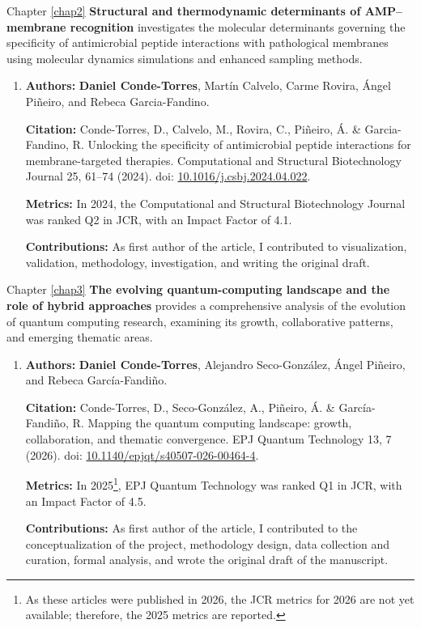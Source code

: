 Chapter \ref{chap2} \textbf{Structural and thermodynamic determinants of AMP–membrane recognition} investigates the molecular determinants governing the specificity of antimicrobial peptide interactions with pathological membranes using molecular dynamics simulations and enhanced sampling methods.
\begin{enumerate}
    \item \textbf{Authors:} \textbf{Daniel Conde-Torres}, Martín Calvelo, Carme Rovira, Ángel Piñeiro, and Rebeca Garcia-Fandino.
    
    \textbf{Citation:} Conde-Torres, D., Calvelo, M., Rovira, C., Piñeiro, Á. \& Garcia-Fandino, R. Unlocking the specificity of antimicrobial peptide interactions for membrane-targeted therapies. Computational and Structural Biotechnology Journal 25, 61–74 (2024). doi: \href{https://doi.org/10.1016/j.csbj.2024.04.022}{10.1016/j.csbj.2024.04.022}.

    \textbf{Metrics:} In 2024, the Computational and Structural Biotechnology Journal was ranked Q2 in JCR, with an Impact Factor of 4.1.

    \textbf{Contributions:} As first author of the article, I contributed to visualization, validation, methodology, investigation, and writing the original draft.
\end{enumerate}






Chapter \ref{chap3}  \textbf{The evolving quantum-computing landscape and the role of hybrid approaches} provides a comprehensive analysis of the evolution of quantum computing research, examining its growth, collaborative patterns, and emerging thematic areas.
\begin{enumerate}
    \item \textbf{Authors:} \textbf{Daniel Conde-Torres}, Alejandro Seco-González, Ángel Piñeiro, and Rebeca García-Fandiño.
    
    \textbf{Citation:} Conde-Torres, D., Seco-González, A., Piñeiro, Á. \& García-Fandiño, R. Mapping the quantum computing landscape: growth, collaboration, and thematic convergence. EPJ Quantum Technology 13, 7 (2026). doi: \href{https://doi.org/10.1140/epjqt/s40507-026-00464-4}{10.1140/epjqt/s40507-026-00464-4}.
    
    \textbf{Metrics:} In 2025\footnote{\label{nota:jcr}As these articles were published in 2026, the JCR metrics for 2026 are not yet available; therefore, the 2025 metrics are reported.}, EPJ Quantum Technology was ranked Q1 in JCR, with an Impact Factor of 4.5.
    
    \textbf{Contributions:} As first author of the article, I contributed to the conceptualization of the project, methodology design, data collection and curation, formal analysis, and wrote the original draft of the manuscript.
\end{enumerate}



